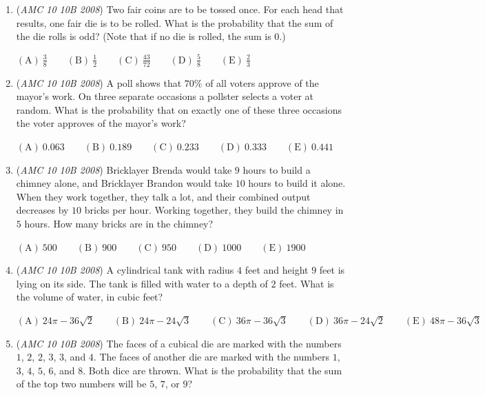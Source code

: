\begin{enumerate}
 $\mathrm{(A)}\ 6\qquad\mathrm{(B)}\ 7\qquad\mathrm{(C)}\ 8\qquad\mathrm{(D)}\ 9\qquad\mathrm{(E)}\ 10$


	\item (\textit{AMC 10 10B 2008}) Two fair coins are to be tossed once. For each head that results, one fair die is to be rolled. What is the probability that the sum of the die rolls is odd? (Note that if no die is rolled, the sum is $0$.)


 $\mathrm{(A)}\ {{{\frac{3} {8}}}} \qquad \mathrm{(B)}\ {{{\frac{1} {2}}}} \qquad \mathrm{(C)}\ {{{\frac{43} {72}}}} \qquad \mathrm{(D)}\ {{{\frac{5} {8}}}} \qquad \mathrm{(E)}\ {{{\frac{2} {3}}}}$


	\item (\textit{AMC 10 10B 2008}) A poll shows that $70\%$ of all voters approve of the mayor's work. On three separate occasions a pollster selects a voter at random. What is the probability that on exactly one of these three occasions the voter approves of the mayor's work?


 $\mathrm{(A)}\ {{{0.063}}} \qquad \mathrm{(B)}\ {{{0.189}}} \qquad \mathrm{(C)}\ {{{0.233}}} \qquad \mathrm{(D)}\ {{{0.333}}} \qquad \mathrm{(E)}\ {{{0.441}}}$


	\item (\textit{AMC 10 10B 2008}) Bricklayer Brenda would take $9$ hours to build a chimney alone, and Bricklayer Brandon would take $10$ hours to build it alone. When they work together, they talk a lot, and their combined output decreases by $10$ bricks per hour. Working together, they build the chimney in $5$ hours. How many bricks are in the chimney?


 $\mathrm{(A)}\ 500\qquad\mathrm{(B)}\ 900\qquad\mathrm{(C)}\ 950\qquad\mathrm{(D)}\ 1000\qquad\mathrm{(E)}\ 1900$


	\item (\textit{AMC 10 10B 2008}) A cylindrical tank with radius $4$ feet and height $9$ feet is lying on its side. The tank is filled with water to a depth of $2$ feet. What is the volume of water, in cubic feet?


 $\mathrm{(A)}\ 24\pi - 36 \sqrt {2} \qquad \mathrm{(B)}\ 24\pi - 24 \sqrt {3} \qquad \mathrm{(C)}\ 36\pi - 36 \sqrt {3} \qquad \mathrm{(D)}\ 36\pi - 24 \sqrt {2} \qquad \mathrm{(E)}\ 48\pi - 36 \sqrt {3}$


	\item (\textit{AMC 10 10B 2008}) The faces of a cubical die are marked with the numbers $1$, $2$, $2$, $3$, $3$, and $4$. The faces of another die are marked with the numbers $1$, $3$, $4$, $5$, $6$, and $8$. Both dice are thrown. What is the probability that the sum of the top two numbers will be $5$, $7$, or $9$?                   



\end{enumerate}
